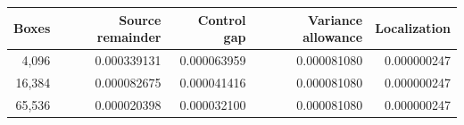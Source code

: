 \begin{tabular}{rrrrr}
\toprule
Boxes & Source remainder & Control gap & Variance allowance & Localization \\
\midrule
4,096 & 0.000339131 & 0.000063959 & 0.000081080 & 0.000000247 \\
16,384 & 0.000082675 & 0.000041416 & 0.000081080 & 0.000000247 \\
65,536 & 0.000020398 & 0.000032100 & 0.000081080 & 0.000000247 \\
\bottomrule
\end{tabular}
